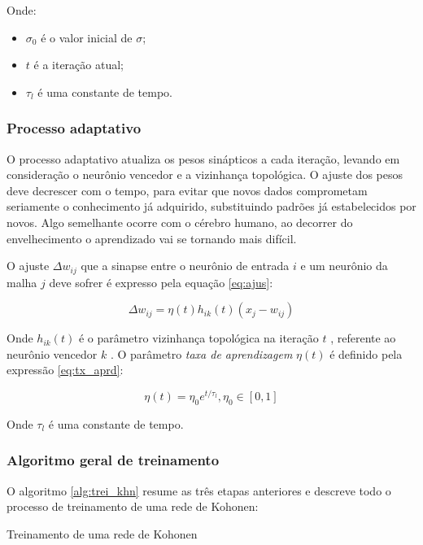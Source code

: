 Onde:

\begin{itemize}
\item $ \sigma_0 $ é o valor inicial de $ \sigma $;
\item $ t $ é a iteração atual;
\item $ \tau_l $ é uma constante de tempo.
\end{itemize}

\subsubsection{Processo adaptativo}

O processo adaptativo atualiza os pesos sinápticos a cada iteração, levando em
consideração o neurônio vencedor e a vizinhança topológica. O ajuste dos pesos
deve decrescer com o tempo, para evitar que novos dados comprometam seriamente
o conhecimento já adquirido, substituindo padrões já estabelecidos por novos.
Algo semelhante ocorre com o cérebro humano, ao decorrer do envelhecimento o
aprendizado vai se tornando mais difícil.

O ajuste $ \Delta w_{ij} $ que a sinapse entre o neurônio de entrada $ i $ e
um neurônio da malha $ j $ deve sofrer é expresso pela equação \ref{eq:ajus}:

\begin{equation}\label{eq:ajus}
\Delta w_{ij} = \eta(t) h_{ik}(t) (x_j - w_{ij})
\end{equation}

Onde $ h_{ik}(t) $ é o parâmetro vizinhança topológica na iteração $ t $ ,
referente ao neurônio vencedor $ k $ . O
parâmetro \textit{taxa de aprendizagem} $ \eta(t) $ é definido pela
expressão \ref{eq:tx_aprd}:

\begin{equation}\label{eq:tx_aprd}
\eta(t) = \eta_0 e^{ t / \tau_l }, \eta_0 \in [0, 1]
\end{equation}

Onde $ \tau_l $ é uma constante de tempo.

\subsubsection{Algoritmo geral de treinamento}

O algoritmo \ref{alg:trei_khn} resume as três etapas anteriores e descreve
todo o processo de treinamento de uma rede de Kohonen:

\begin{algorithm}[H]
\caption{Treinamento de uma rede de Kohonen}\label{alg:trei_khn}
\end{algorithm}


